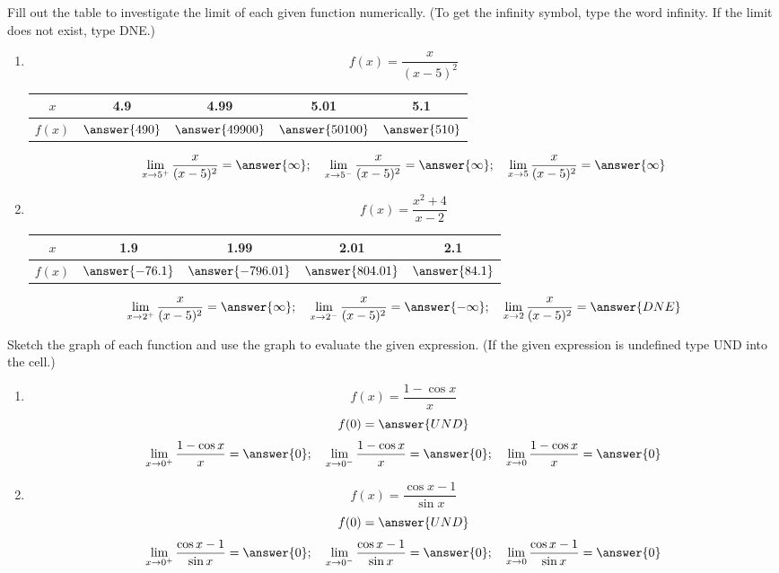 \documentclass{ximera}
\begin{document}
\begin{problem}\label{prob:240hom1prob2}
Fill out the table to investigate the limit of each given function numerically.  (To get the infinity symbol, type the word infinity. If the limit does not exist, type DNE.)
\begin{enumerate}
    \item $$f(x)=\frac{x}{(x-5)^2}$$
    \begin{center}
    \begin{tabular}{|c|c|c|c|c|}
         $x$ & 4.9 & 4.99 & 5.01 & 5.1  \\
         \hline
         $f(x)$ & $\answer{490}$ & $\answer{49900}$ & $\answer{50100}$ & $\answer{510}$ 
    \end{tabular}
    \end{center}
    $$\lim_{x\to 5^+}\frac{x}{(x-5)^2}=\answer{\infty};\quad \lim_{x\to 5^-}\frac{x}{(x-5)^2}=\answer{\infty};\quad \lim_{x\to 5}\frac{x}{(x-5)^2}=\answer{\infty}$$
    
    \item $$f(x)=\frac{x^2+4}{x-2}$$
    \begin{center}
    \begin{tabular}{|c|c|c|c|c|}
         $x$ & 1.9 & 1.99 & 2.01 & 2.1  \\
         \hline
         $f(x)$ & $\answer{-76.1}$ & $\answer{-796.01}$ & $\answer{804.01}$ & $\answer{84.1}$ 
    \end{tabular}
    \end{center}
    $$\lim_{x\to 2^+}\frac{x}{(x-5)^2}=\answer{\infty};\quad \lim_{x\to 2^-}\frac{x}{(x-5)^2}=\answer{-\infty};\quad \lim_{x\to 2}\frac{x}{(x-5)^2}=\answer{DNE}$$
\end{enumerate}
\end{problem}

\begin{problem}\label{prob:240hom1prob3}
Sketch the graph of each function and use the graph to evaluate the given expression.  (If the given expression is undefined type UND into the cell.)
   \begin{enumerate}
       \item $$f(x)=\frac{1-\cos x}{x}$$
       $$f(0)=\answer{UND}$$
       $$\lim_{x\to 0^+}\frac{1-\cos x}{x}=\answer{0};\quad \lim_{x\to 0^-}\frac{1-\cos x}{x}=\answer{0};\quad \lim_{x\to 0}\frac{1-\cos x}{x}=\answer{0}$$
       \item $$f(x)=\frac{\cos x-1}{\sin x}$$
       $$f(0)=\answer{UND}$$
       $$\lim_{x\to 0^+}\frac{\cos x-1}{\sin x}=\answer{0};\quad \lim_{x\to 0^-}\frac{\cos x-1}{\sin x}=\answer{0};\quad \lim_{x\to 0}\frac{\cos x-1}{\sin x}=\answer{0}$$
          \end{enumerate}
 
\end{problem}
\end{document}
